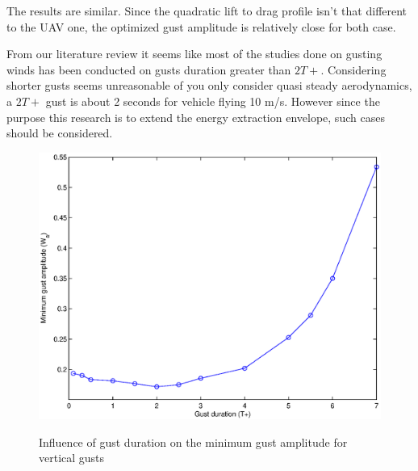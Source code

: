 \par The results are similar.
Since the quadratic lift to drag profile isn't that different to the UAV one, the optimized gust amplitude is relatively close for both case.

\FloatBarrier

%



From our literature review it seems like most of the studies done on gusting winds has been conducted on gusts duration greater than $2T+$.
Considering shorter gusts seems unreasonable of you only consider quasi steady aerodynamics, a $2T+$ gust is about 2 seconds for vehicle flying 10 m/s.
However since the purpose this research is to extend the energy extraction envelope, such cases should be considered.

\begin{figure}[h!]
	\begin{center}
		\scalebox{0.8}
		{\includegraphics{./Figures/Vertical_gust_amplitude_vs_duration.eps}}
	\end{center}
	\caption{Influence of gust duration on the minimum gust amplitude for vertical gusts}
	\label{fig:vertical_amplitude_duration}
\end{figure}

